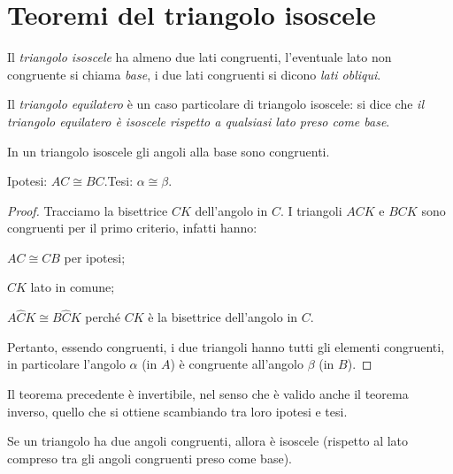\section{Teoremi del triangolo isoscele}\label{sect:teoremi_triangolo_isoscele}

Il \emph{triangolo isoscele} ha almeno due lati congruenti, l'eventuale lato non congruente si chiama \emph{base}, i due lati congruenti si dicono \emph{lati obliqui}.

Il \emph{triangolo equilatero} è un caso particolare di triangolo isoscele: si dice che \emph{il triangolo equilatero è isoscele rispetto a qualsiasi lato preso come base}.

\begin{teorema}
In un triangolo isoscele gli angoli alla base sono congruenti.
\end{teorema}

\begin{figure}[htb]
\centering
\end{figure}

\noindent Ipotesi: $AC\cong BC$.\tab Tesi: $\alpha\cong \beta$.

\begin{proof}
Tracciamo la bisettrice $CK$ dell'angolo in $C$.
I triangoli $ACK$ e $BCK$ sono congruenti per il primo criterio, infatti hanno:
\begin{itemize*}
\item $AC\cong CB$ per ipotesi;
\item $CK$ lato in comune;
\item $A\widehat{C}K\cong B\widehat{C}K$ perché $CK$ è la bisettrice dell'angolo in $C$.
\end{itemize*}
Pertanto, essendo congruenti, i due triangoli hanno tutti gli elementi congruenti, in particolare l'angolo $\alpha$ (in $A$) è congruente all'angolo $\beta$ (in $B$).
\end{proof}

Il teorema precedente è invertibile, nel senso che è valido anche il teorema inverso, quello che si ottiene scambiando tra loro ipotesi e tesi.

\begin{teorema}
Se un triangolo ha due angoli congruenti, allora è isoscele (rispetto al lato compreso tra gli angoli congruenti preso come base).
\end{teorema}

